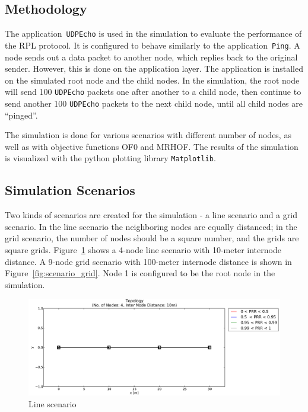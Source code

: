 \subsection{Methodology}
\label{Sim:Method}
The application~\texttt{UDPEcho} is used in the simulation to evaluate the performance of the RPL protocol. It is configured to behave similarly to the application~\texttt{Ping}. A node sends out a data packet to another node, which replies back to the original sender. However, this is done on the application layer. The application is installed on the simulated root node and the child nodes. In the simulation, the root node will send 100 \texttt{UDPEcho} packets one after another to a child node, then continue to send another 100 \texttt{UDPEcho} packets to the next child node, until all child nodes are  ``pinged''.     

The simulation is done for various scenarios with different number of nodes, as well as with objective functions OF0 and MRHOF. The results of the simulation is visualized with the python plotting library \texttt{Matplotlib}.

\subsection{Simulation Scenarios}
\label{Sim:Scenarios}

Two kinds of scenarios are created for the simulation - a line scenario and a grid scenario. In the line scenario the neighboring nodes are equally distanced; in the grid scenario, the number of nodes should be a square number, and the grids are square grids. Figure~\ref{fig:scenario_line} shows a 4-node line scenario with 10-meter internode distance. A 9-node grid scenario with 100-meter internode distance is shown in Figure~\ref{fig:scenario_grid}. Node 1 is configured to be the root node in the simulation.

\begin{figure}[htpb]
 	\centering
    \leavevmode
      \includegraphics[scale=0.35]{Pics/results/topo4_dist10_line.pdf}
    \caption{Line scenario}
    \label{fig:scenario_line}
\end{figure}

